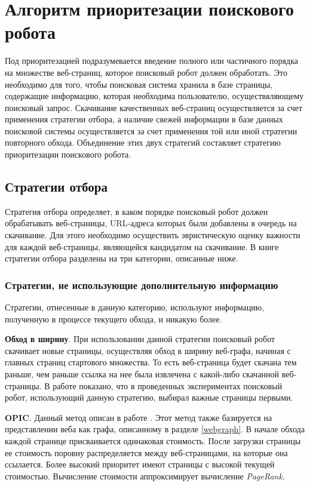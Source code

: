\section{Алгоритм приоритезации поискового робота}
\label{algorithms}

Под приоритезацией подразумевается введение полного или частичного порядка на множестве веб-страниц, которое поисковый робот должен обработать. Это необходимо для того, чтобы поисковая система хранила в базе страницы, содержащие информацию, которая необходима пользователю, осуществяляющему поисковый запрос. Скачивание качественных веб-страниц осуществляется за счет применения стратегии отбора, а наличие свежей информации в базе данных поисковой системы осуществляется за счет применения той или иной стратегии повторного обхода. Объединение этих двух стратегий составляет стратегию приоритезации поискового робота. 

\subsection{Стратегии отбора}

Стратегия отбора определяет, в каком порядке поисковый робот должен обрабатывать веб-страницы, URL-адреса которых были добавлены в очередь на скачивание. Для этого необходимо осуществить эвристическую оценку важности для каждой веб-страницы, являющейся кандидатом на скачивание. В книге \cite{Castillo} стратегии отбора разделены на три категории, описанные ниже.

\subsubsection*{Стратегии, не использующие дополнительную информацию}

Стратегии, отнесенные в данную категорию, используют информацию, полученную в процессе текущего обхода, и никакую более.

\textbf{Обход в ширину}. При использовании данной стратегии поисковый робот скачивает новые страницы, осуществляя обход в ширину веб-графа, начиная с главных страниц стартового множества. То есть веб-страница будет скачана тем раньше, чем раньше ссылка на нее была извлечена с какой-либо скачанной веб-страницы. В работе \cite{Najork} показано, что в проведенных экспериментах поисковый робот, использующий данную стратегию, выбирал важные страницы первыми.

\textbf{OPIC}. Данный метод описан в работе \cite{OPIC}. Этот метод также базируется на представлении веба как графа, описанному в разделе \ref{webgraph}. В начале обхода каждой странице присваивается одинаковая стоимость. После загрузки страницы ее стоимость поровну распределяется между веб-страницами, на которые она ссылается. Более высокий приоритет имеют страницы с высокой текущей стоимостью. Вычисление стоимости аппроксимирует вычисление \textit{PageRank}. 

